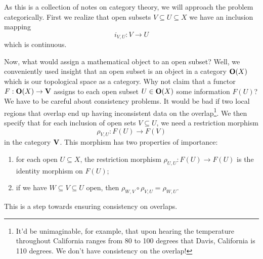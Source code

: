 As this is a collection of notes on category theory, we will
approach the problem categorically. First we realize that open
subsets $V\subseteq U\subseteq X$ we have an inclusion mapping
\begin{equation}%
i_{V,U}:V\to U
\end{equation}
which is continuous.

Now, what would assign a mathematical object to an open subset?
Well, we conveniently used insight that an open subset is an
object in a category $\mathbf{O}(X)$ which is our topological space as a
category. Why not claim that a functor $F:\mathbf{O}(X)\to\mathbf{V}$
assigns to each open subset $U\in\mathbf{O}(X)$ some information $F(U)$?
We have to be careful about consistency problems. It would be bad
if two local regions that overlap end up having inconsistent data
on the overlap\footnote{It'd be unimaginable, for example, that
  upon hearing the temperature throughout California ranges from
  80 to 100 degrees that Davis, California is 110 degrees. We
  don't have consistency on the overlap!}. We then specify that
for each inclusion of open sets $V\subseteq U$, we need a
restriction morphism
\begin{equation}%
\rho_{V,U}:F(U)\to F(V)
\end{equation}
in the category $\mathbf{V}$. This morphism has two properties of
importance:
\begin{enumerate}
\item for each open $U\subseteq X$, the restriction morphism
  $\rho_{U,U}:F(U)\to F(U)$ is the identity morphism on $F(U)$; 
\item if we have $W\subseteq V\subseteq U$ open, then
  $\rho_{W,V}\circ\rho_{V,U} = \rho_{W,U}$.
\end{enumerate}
This is a step towards ensuring consistency on overlaps.

